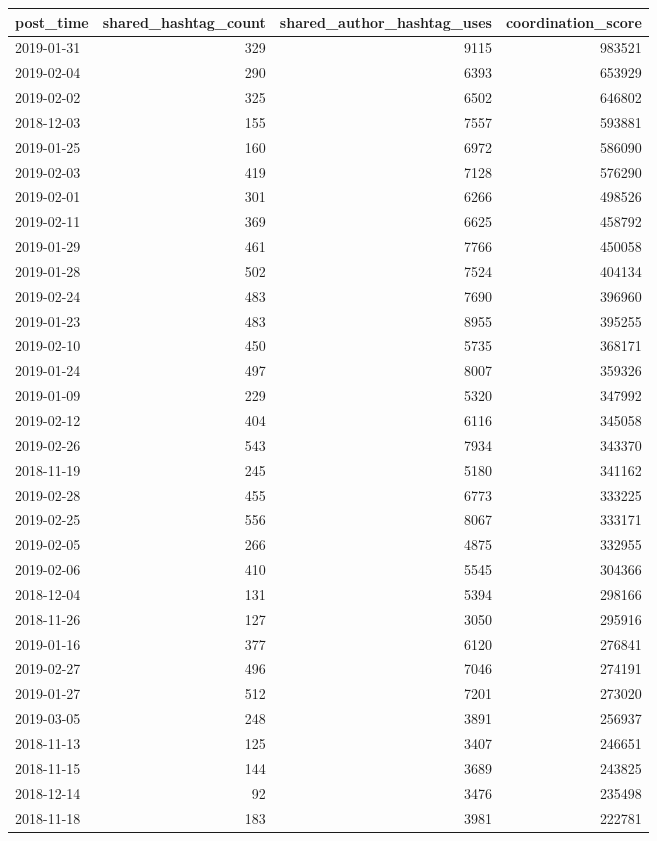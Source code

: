 \begin{tabular}{lrrr}
\toprule
post\_time & shared\_hashtag\_count & shared\_author\_hashtag\_uses & coordination\_score \\
\midrule
2019-01-31 & 329 & 9115 & 983521 \\
2019-02-04 & 290 & 6393 & 653929 \\
2019-02-02 & 325 & 6502 & 646802 \\
2018-12-03 & 155 & 7557 & 593881 \\
2019-01-25 & 160 & 6972 & 586090 \\
2019-02-03 & 419 & 7128 & 576290 \\
2019-02-01 & 301 & 6266 & 498526 \\
2019-02-11 & 369 & 6625 & 458792 \\
2019-01-29 & 461 & 7766 & 450058 \\
2019-01-28 & 502 & 7524 & 404134 \\
2019-02-24 & 483 & 7690 & 396960 \\
2019-01-23 & 483 & 8955 & 395255 \\
2019-02-10 & 450 & 5735 & 368171 \\
2019-01-24 & 497 & 8007 & 359326 \\
2019-01-09 & 229 & 5320 & 347992 \\
2019-02-12 & 404 & 6116 & 345058 \\
2019-02-26 & 543 & 7934 & 343370 \\
2018-11-19 & 245 & 5180 & 341162 \\
2019-02-28 & 455 & 6773 & 333225 \\
2019-02-25 & 556 & 8067 & 333171 \\
2019-02-05 & 266 & 4875 & 332955 \\
2019-02-06 & 410 & 5545 & 304366 \\
2018-12-04 & 131 & 5394 & 298166 \\
2018-11-26 & 127 & 3050 & 295916 \\
2019-01-16 & 377 & 6120 & 276841 \\
2019-02-27 & 496 & 7046 & 274191 \\
2019-01-27 & 512 & 7201 & 273020 \\
2019-03-05 & 248 & 3891 & 256937 \\
2018-11-13 & 125 & 3407 & 246651 \\
2018-11-15 & 144 & 3689 & 243825 \\
2018-12-14 & 92 & 3476 & 235498 \\
2018-11-18 & 183 & 3981 & 222781 \\

\end{tabular}
